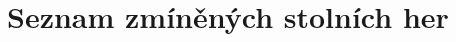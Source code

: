 \appendix
\chapter{Seznam zmíněných stolních her}
\renewcommand{\glossarysection}[2][]{}
\printnoidxglossary[]